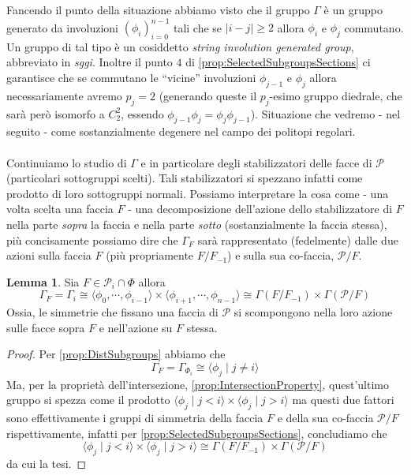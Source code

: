 \documentclass[a4paper,12pt]{report}
\newcommand{\p}{\mathcal{P}}
\theoremstyle{plain}
\theoremstyle{definition}
\newtheorem{lem}[teo]{Lemma}
\begin{document}
Fancendo il punto della situazione abbiamo visto che il gruppo $\Gamma$ \`e un gruppo generato da involuzioni $(\phi_i)_{i=0}^{n-1}$ tali che
se $|i-j|\geq 2$ allora $\phi_i$ e $\phi_j$ commutano. Un gruppo di tal tipo \`e un cosiddetto \emph{string involution generated group},
abbreviato in \emph{sggi}. Inoltre il punto $4$ di \ref{prop:SelectedSubgroupsSections} ci garantisce che se commutano le ``vicine''
involuzioni $\phi_{j-1}$ e $\phi_j$ allora necessariamente avremo $p_j=2$ (generando queste il $p_j$-esimo gruppo diedrale, che sar\`a per\`o isomorfo
a $C_2^2$, essendo $\phi_{j-1}\phi_j=\phi_j\phi_{j-1}$). Situazione che vedremo - nel seguito - come sostanzialmente degenere nel campo dei
politopi regolari.\\\\
Continuiamo lo studio di $\Gamma$ e in particolare degli stabilizzatori delle facce di $\p$ (particolari sottogruppi scelti).
Tali stabilizzatori si spezzano infatti come prodotto di loro sottogruppi normali.
Possiamo interpretare la cosa come - una volta scelta una faccia $F$ - una decomposizione dell'azione
dello stabilizzatore di $F$ nella parte \emph{sopra} la faccia e nella parte \emph{sotto} (sostanzialmente la faccia stessa), pi\`u concisamente
possiamo dire
che $\Gamma_F$ sar\`a rappresentato (fedelmente) dalle due azioni sulla faccia $F$ (pi\`u propriamente $F/F_{-1}$) e sulla sua co-faccia, $\p/F$.
\begin{lem}
\label{lem:StabilizerFaceIsProduct}
Sia $F\in\p_i\cap\Phi$ allora
\begin{equation*}
\Gamma_F=\Gamma_{i}\cong\langle\phi_0,\cdots,\phi_{i-1}\rangle\times\langle\phi_{i+1},\cdots,\phi_{n-1}\rangle\cong\Gamma(F/F_{-1})\times\Gamma(\p/F)
\end{equation*}
Ossia, le simmetrie che fissano una faccia di $\p$ si scompongono nella loro azione sulle facce sopra $F$ e nell'azione su $F$ stessa.
\end{lem}
\begin{proof}
Per \ref{prop:DistSubgroups} abbiamo che 
\begin{equation*}
\Gamma_F=\Gamma_{\Phi_i}\cong\langle\phi_j\mid j\neq i\rangle
\end{equation*}
Ma, per la propriet\`a dell'intersezione, \ref{prop:IntersectionProperty}, quest'ultimo gruppo si spezza come il prodotto
$\langle\phi_j\mid j<i\rangle\times\langle\phi_j\mid j>i\rangle$ ma questi due fattori sono effettivamente i gruppi di simmetria
della faccia $F$ e della sua co-faccia $\p/F$ rispettivamente, infatti per \ref{prop:SelectedSubgroupsSections}, concludiamo che
\begin{equation*}
\langle\phi_j\mid j<i\rangle\times\langle\phi_j\mid j>i\rangle\cong\Gamma(F/F_{-1})\times\Gamma(\p/F)
\end{equation*}
da cui la tesi.
\end{proof}
\end{document}
